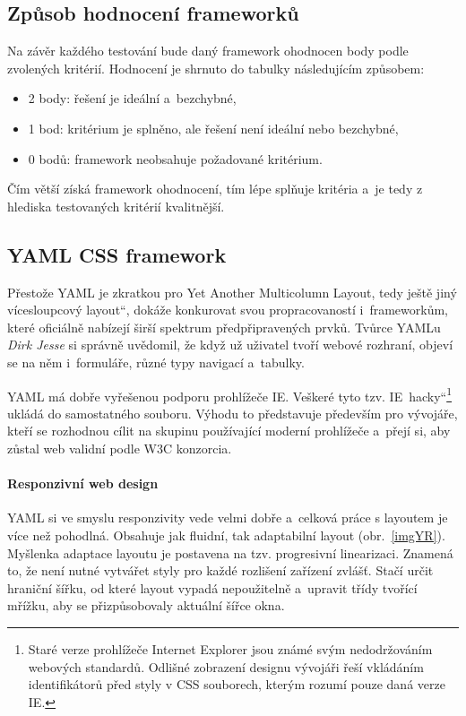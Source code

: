 \documentclass[thesis=B,czech]{FITthesis}[2012/06/26]
\begin{document}
\subsection{Způsob hodnocení frameworků}

Na závěr každého testování bude daný framework ohodnocen body podle zvolených kritérií. Hodnocení je shrnuto do tabulky následujícím způsobem:

\begin{itemize}
 \item 2 body: řešení je ideální a~bezchybné,
 \item 1 bod: kritérium je splněno, ale řešení není ideální nebo bezchybné,
 \item 0 bodů: framework neobsahuje požadované kritérium.
\end{itemize}
Čím větší získá framework ohodnocení, tím lépe splňuje kritéria a~je tedy z hlediska testovaných kritérií kvalitnější.


\subsection{YAML CSS framework}

Přestože \gls{YAML} je zkratkou pro Yet Another Multicolumn Layout, tedy \quotedblbase ještě jiný vícesloupcový layout\textquotedblleft , dokáže konkurovat svou propracovaností i~frameworkům, které oficiálně nabízejí širší spektrum předpřipravených prvků. Tvůrce \gls{YAML}u \textit{Dirk Jesse} si správně uvědomil, že když už uživatel tvoří webové rozhraní, objeví se na něm i~formuláře, různé typy navigací a~tabulky. 

\gls{YAML} má dobře vyřešenou podporu prohlížeče \gls{IE}. Veškeré tyto tzv. \quotedblbase IE~hacky\textquotedblleft\footnote{Staré verze prohlížeče Internet Explorer jsou známé svým nedodržováním webových standardů. Odlišné zobrazení designu vývojáři řeší vkládáním identifikátorů před styly v \gls{CSS} souborech, kterým rozumí pouze daná verze IE.} ukládá do samostatného souboru. Výhodu to představuje především pro vývojáře, kteří se rozhodnou cílit na skupinu používající moderní prohlížeče a~přejí si, aby zůstal web validní podle \gls{W3C} konzorcia. 

\paragraph{Responzivní web design}

\gls{YAML} si ve smyslu responzivity vede velmi dobře a~celková práce s layoutem je více než pohodlná. Obsahuje jak fluidní, tak adaptabilní layout (obr.~\ref{imgYR}). Myšlenka adaptace layoutu je postavena na tzv. progresivní linearizaci. Znamená to, že není nutné vytvářet styly pro každé rozlišení zařízení zvlášť. Stačí určit hraniční šířku, od které layout vypadá nepoužitelně a~upravit třídy tvořící mřížku, aby se přizpůsobovaly aktuální šířce okna.
\end{document}
